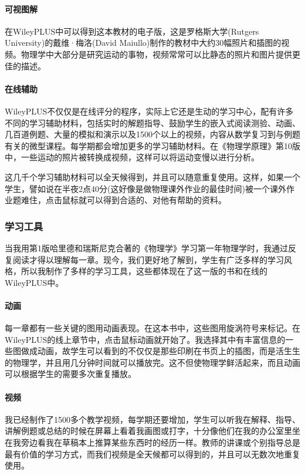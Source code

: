 \paragraph{可视图解}在WileyPLUS中可以得到这本教材的电子版，这是罗格斯大学(Rutgers University)的戴维·梅洛(David Maiullo)制作的教材中大约30幅照片和插图的视频。物理学中大部分是研究运动的事物，视频常常可以比静态的照片和图片提供更佳的描述。

\paragraph{在线辅助}WileyPLUS不仅仅是在线评分的程序，实际上它还是生动的学习中心，配有许多不同的学习辅助材料，包括实时的解题指导、鼓励学生的嵌入式阅读测验、动画、几百道例题、大量的模拟和演示以及1500个以上的视频，内容从数学复习到与例题有关的微型课程。每学期都会增加更多的学习辅助材料。在《物理学原理》第10版中，一些运动的照片被转换成视频，这样可以将运动变慢以进行分析。

这几千个学习辅助材料可以全天候得到，并且可以随意重复使用。这样，如果一个学生，譬如说在半夜2点40分(这好像是做物理课外作业的最佳时间)被一个课外作业题难住，点击鼠标就可以得到合适的、对他有帮助的资料。

\subsubsection*{学习工具}
当我用第1版哈里德和瑞斯尼克合著的《物理学》学习第一年物理学时，我通过反复阅读才得以理解每一章。现今，我们更好地了解到，学生有广泛多样的学习风格，所以我制作了多样的学习工具，这些都体现在了这一版的书和在线的WileyPLUS中。

\paragraph{动画}每一章都有一些关键的图用动画表现。在这本书中，这些图用旋涡符号来标记。在WileyPLUS的线上章节中，点击鼠标动画就开始了。我选择其中有丰富信息的一些图做成动画，故学生可以看到的不仅仅是那些印刷在书页上的插图，而是活生生的物理学，并且用几分钟时间就可以播放完。这不但使物理学鲜活起来，而且动画可以根据学生的需要多次重复播放。

\paragraph{视频}我已经制作了1500多个教学视频，每学期还要增加，学生可以听我在解释、指导、讲解例题或总结的时候在屏幕上看着我画图或打字，十分像他们在我的办公室里坐在我旁边看我在草稿本上推算某些东西时的经历一样。教师的讲课或个别指导总是最有价值的学习方式，而我们视频是全天候都可以得到的，并且可以无数次地重复使用。

